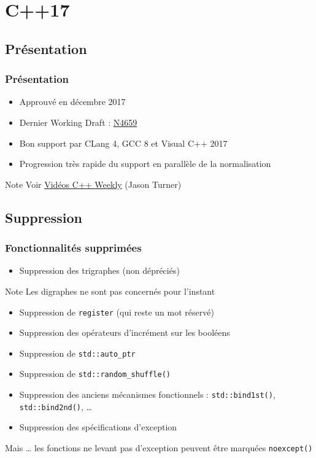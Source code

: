 \documentclass[C++.tex]{subfiles}
\begin{document}
\section{C++17}
\subsection*{Présentation}
\begin{frame}
	\frametitle{Présentation}
	\begin{itemize}
		\item Approuvé en décembre 2017
		\item Dernier Working Draft : \href{http://www.open-std.org/jtc1/sc22/wg21/docs/papers/2017/n4659.pdf}{N4659}
		\item Bon support par CLang 4, GCC 8 et Visual C++ 2017
		\item Progression très rapide du support en parallèle de la normalisation
	\end{itemize}

	\begin{block}{Note}
		Voir \href{https://www.youtube.com/user/lefticus1/videos}{Vidéos C++ Weekly} (Jason Turner)
	\end{block}
\end{frame}

\subsection*{Suppression}
\begin{frame}[fragile]
	\frametitle{Fonctionnalités supprimées}
	\begin{itemize}
		\item Suppression des trigraphes (non dépréciés)
	\end{itemize}

	\begin{block}{Note}
		Les digraphes ne sont pas concernés pour l'instant
	\end{block}

	\begin{itemize}
		\item Suppression de \lstinline|register| (qui reste un mot réservé)
		\item Suppression des opérateurs d'incrément sur les booléens


		\item Suppression de \lstinline|std::auto_ptr|
		\item Suppression de \lstinline|std::random_shuffle()|
		\item Suppression des anciens mécanismes fonctionnels : \lstinline|std::bind1st()|, \lstinline|std::bind2nd()|, \ldots
		\item Suppression des spécifications d'exception
	\end{itemize}
		
	\begin{block}{Mais \ldots}
		les fonctions ne levant pas d'exception peuvent être marquées \lstinline|noexcept()|
	\end{block}
\end{frame}
\end{document}
